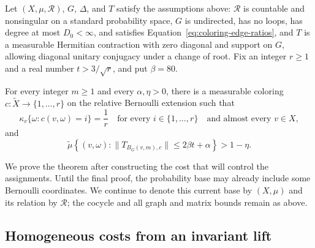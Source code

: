 \begin{theorem}
\label{thm:bernoulli-coloring}
Let $(X,\mu,\mathcal R)$, $G$, $\Delta$, and $T$ satisfy the assumptions
above: $\mathcal R$ is countable and nonsingular on a standard probability
space, $G$ is undirected, has no loops, has degree at most $D_0<\infty$, and satisfies
Equation~\eqref{eq:coloring-edge-ratios}, and $T$ is a measurable
Hermitian contraction with zero diagonal and support on $G$, allowing
diagonal unitary conjugacy under a change of root.  Fix an integer $r\geq1$
and a real number $t>3/\sqrt r$, and put $\beta=80$.

For every integer $m\geq1$ and every $\alpha,\eta>0$, there is a measurable
coloring $c:\widetilde X\to\{1,\ldots,r\}$ on the relative Bernoulli
extension such that
\begin{equation}
 \kappa_v\{\omega:c(v,\omega)=i\}=\frac1r
 \quad\text{for every }i\in\{1,\ldots,r\}
 \quad\text{and almost every }v\in X,
 \label{eq:coloring-marginal}
\end{equation}
and
\begin{equation}
 \widetilde\mu\left\{(v,\omega):
       \|T_{B_G(v,m),c}\|\leq2\beta t+\alpha\right\}>1-\eta.
 \label{eq:coloring-ball-conclusion}
\end{equation}
\end{theorem}

We prove the theorem after constructing the cost that will control the
assignments.  Until the final proof, the probability base may already
include some Bernoulli coordinates.  We continue to denote this current
base by $(X,\mu)$ and its relation by $\mathcal R$; the cocycle and all graph
and matrix bounds remain as above.

\subsection{Homogeneous costs from an invariant lift}

